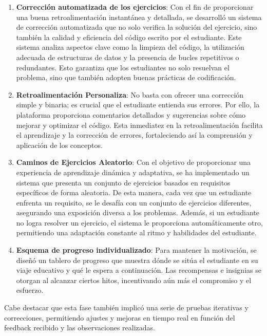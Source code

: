 \begin{enumerate}
    \item \textbf{Corrección automatizada de los ejercicios}: Con el fin de proporcionar una buena retroalimentación instantánea y detallada, se desarrolló un sistema de corrección automatizada que no solo verifica la solución del ejercicio, sino también la calidad y eficiencia del código escrito por el estudiante. Este sistema analiza aspectos clave como la limpieza del código, la utilización adecuada de estructuras de datos y la presencia de bucles repetitivos o redundantes. Esto garantiza que los estudiantes no solo resuelvan el problema, sino que también adopten buenas prácticas de codificación.

    \item \textbf{Retroalimentación Personaliza}: No basta con ofrecer una corrección simple y binaria; es crucial que el estudiante entienda sus errores. Por ello, la plataforma proporciona comentarios detallados y sugerencias sobre cómo mejorar y optimizar el código. Esta inmediatez en la retroalimentación facilita el aprendizaje y la corrección de errores, fortaleciendo así la comprensión y aplicación de los conceptos.

    \item \textbf{Caminos de Ejercicios Aleatorio}: Con el objetivo de proporcionar una experiencia de aprendizaje dinámica y adaptativa, se ha implementado un sistema que presenta un conjunto de ejercicios basados en requisitos específicos de forma aleatoria. De esta manera, cada vez que un estudiante enfrenta un requisito, se le desafía con un conjunto de ejercicios diferentes, asegurando una exposición diversa a los problemas. Además, si un estudiante no logra resolver un ejercicio, el sistema le proporciona automáticamente otro, permitiendo una adaptación constante al ritmo y habilidades del estudiante.
    
    \item \textbf{Esquema de progreso individualizado}: Para mantener la motivación, se diseñó un tablero de progreso que muestra dónde se sitúa el estudiante en su viaje educativo y qué le espera a continuación. Las recompensas e insignias se otorgan al alcanzar ciertos hitos, incentivando aún más el compromiso y el esfuerzo. 
\end{enumerate}

Cabe destacar que esta fase también implicó una serie de pruebas iterativas y correcciones, permitiendo ajustes y mejoras en tiempo real en función del feedback recibido y las observaciones realizadas.

